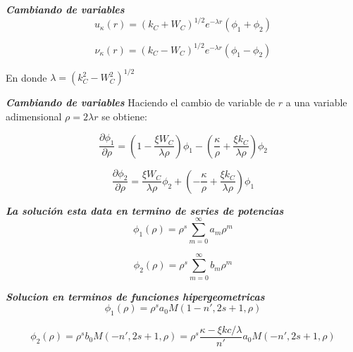 \documentclass{beamer}
\begin{document}
\begin{frame}{\textit{\textbf{Cambiando de variables}}}
\begin{equation}\label{eq:cdv}
u_{\kappa}(r) = (k_C + W_C)^{1/2} e^{-\lambda r}(\phi_1 + \phi_2)
\end{equation}

\begin{equation}
\nu_{\kappa}(r) = (k_C - W_C )^{1/2} e^{-\lambda r} (\phi_1 - \phi_2)
\end{equation}

En donde $\lambda = (k_C^2 - W_C^2)^{1/2}$
\end{frame}



\begin{frame}{\textit{\textbf{Cambiando de variables}}}
Haciendo el cambio de variable de $r$ a una variable adimensional $\rho = 2 \lambda r$
se obtiene:

\begin{equation}\label{eq:sol1}
\dfrac{\partial \phi_1}{\partial \rho} = \left( 1-\dfrac{\xi W_C}{\lambda  \rho} \right) 
\phi_1 - \left( \dfrac{\kappa}{\rho} + \dfrac{\xi k_C}{\lambda \rho}  \right)\phi_2
\end{equation}

\begin{equation}\label{eq:sol2}
\dfrac{\partial \phi_2}{\partial \rho} = \dfrac{\xi W_C}{\lambda  \rho} \phi_2 
+ \left( -\dfrac{\kappa}{\rho} + \dfrac{\xi k_C}{\lambda \rho}  \right)\phi_1
\end{equation}
\end{frame}

\begin{frame}{\textit{\textbf{La soluci\'on esta data en termino de series de potencias}}}
\begin{equation}\label{eq:phi1}
\phi_1(\rho) = \rho^s \sum \limits_{m=0}^{\infty} a_m \rho^m
\end{equation}


\begin{equation} \label{eq:phi2}
\phi_2(\rho) = \rho^s \sum \limits_{m=0}^{\infty} b_m \rho^m
\end{equation}

\end{frame}

\begin{frame}{\textit{\textbf{Solucion en terminos de funciones hipergeometricas}}}
\begin{equation}\label{eq:sol1}
\phi_1(\rho) = 	\rho^s a_0 M(1-n',2s+1,\rho)
\end{equation}

\begin{equation}\label{eq:sol2}
\phi_2(\rho) = \rho^s b_0 M(-n',2s+1,\rho) = \rho^s \dfrac{\kappa - \xi kc / \lambda}{n'} a_0 M(-n',2s+1,\rho)
\end{equation}
\end{frame}
\end{document}
